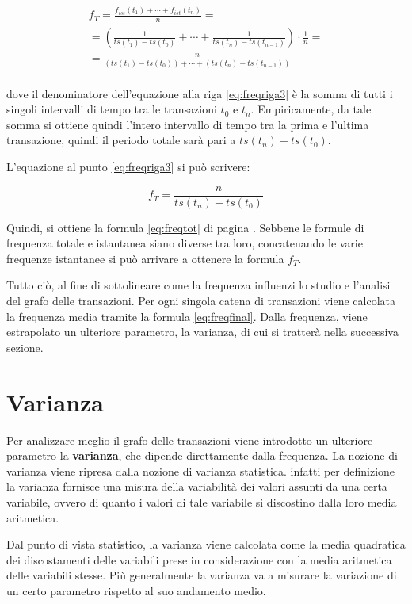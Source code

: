 \begin{eqnarray}
	f_T = \frac{f_{ist}(t_1)+\cdots+f_{ist}(t_n)}{n} = \label{eq:freqriga1} \\[20pt]
	= \left( \frac{1}{ts(t_1) - ts(t_0)}+\cdots+\frac{1}{ ts(t_n) - ts(t_{n-1})} \right) \cdot \frac{1}{n} = \label{eq:freqriga2}\\[20pt]
	= \frac{n}{( ts(t_1) - ts(t_0))+\cdots+(ts(t_n) - ts(t_{n-1}) )} \label{eq:freqriga3}
\end{eqnarray}
\\
dove il denominatore dell'equazione alla riga \ref{eq:freqriga3} è la somma di tutti i singoli intervalli di tempo tra le transazioni $t_0$ e $t_n$. Empiricamente, da tale somma si ottiene quindi l'intero intervallo di tempo tra la prima e l'ultima transazione, quindi il periodo totale sarà pari a $ts(t_n) - ts(t_0)$. 

L'equazione al punto \ref{eq:freqriga3} si può scrivere:

\begin{equation}
	f_T =  \frac{n}{ts(t_n) - ts(t_0)}
	\label{eq:freqfinal}
\end{equation}

Quindi, si ottiene la formula \ref{eq:freqtot} di pagina \pageref{eq:freqtot}. Sebbene le formule di frequenza totale e istantanea siano diverse tra loro, concatenando le varie frequenze istantanee si può arrivare a ottenere la formula $f_T$. 

Tutto ciò, al fine di sottolineare come la frequenza influenzi lo studio e l'analisi del grafo delle transazioni. Per ogni singola catena di transazioni viene calcolata la frequenza media tramite la formula \ref{eq:freqfinal}. Dalla frequenza, viene estrapolato un ulteriore parametro, la varianza, di cui si tratterà nella successiva sezione.

\section{Varianza}
Per analizzare meglio il grafo delle transazioni viene introdotto un ulteriore parametro la \textbf{varianza}, che dipende direttamente dalla frequenza. 
La nozione di varianza viene ripresa dalla nozione di varianza statistica. infatti per definizione la varianza fornisce una misura della variabilità dei valori assunti da una certa variabile, ovvero di quanto i valori di tale variabile si discostino dalla loro media aritmetica. \cite{wiki:varianza}

Dal punto di vista statistico, la varianza viene calcolata come la media quadratica dei discostamenti delle variabili prese in considerazione con la media aritmetica delle variabili stesse. Più generalmente la varianza va a misurare la variazione di un certo parametro rispetto al suo andamento medio.

